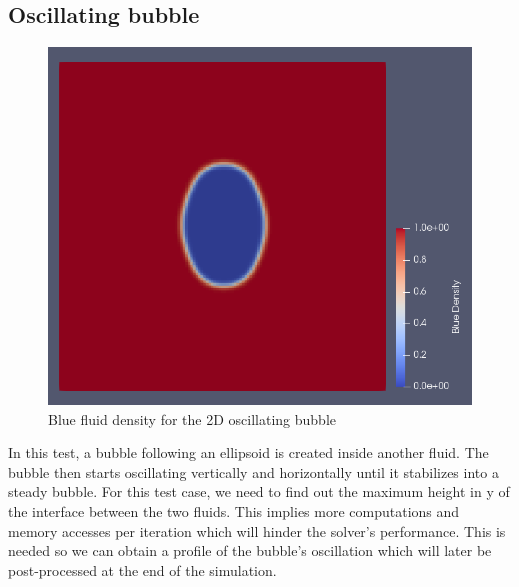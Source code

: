 \documentclass[12pt, openany]{book}
\begin{document}
\subsection{Oscillating bubble}
\begin{figure}[H]
	\centering
	\includegraphics[width=0.9\linewidth]{Resources/Images/oscil.png}
	\caption{Blue fluid density for the 2D oscillating bubble}
	\label{fig:oscil}
\end{figure}
In this test, a bubble following an ellipsoid is created inside another fluid. The bubble then starts oscillating vertically and horizontally until it stabilizes into a steady bubble. For this test case, we need to find out the maximum height in y of the interface between the two fluids. This implies more computations and memory accesses per iteration which will hinder the solver's performance. This is needed so we can obtain a profile of the bubble's oscillation which will later be post-processed at the end of the simulation.  
\end{document}
